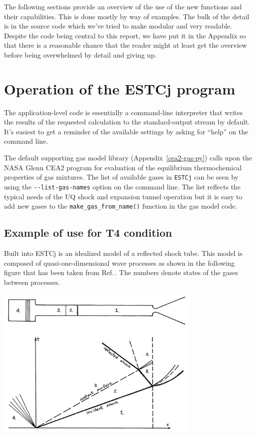 \documentclass[landscape,12pt,a4paper]{article}
\begin{document}
\medskip
The following sections provide an overview of the use of the new functions and their capabilities.
This is done mostly by way of examples.
The bulk of the detail is in the source code which we've tried to make modular and very readable.
Despite the code being central to this report, we have put it in the Appendix so that there is
a reasonable chance that the reader might at least get the overview 
before being overwhelmed by detail and giving up.

\newpage
\section{Operation of the ESTCj program}
%
The application-level code is essentially a command-line interpreter
that writes the results of the requested calculation to the standard-output stream
by default.
It's easiest to get a reminder of the available settings by asking for ``help''
on the command line.



The default supporting gas model library (Appendix~\ref{cea2-gas-py}) calls upon the NASA Glenn CEA2 program 
for evaluation of the equilibrium thermochemical properties of gas mixtures.
The list of available gases in \verb!ESTCj! can be seen by using the \verb!--list-gas-names! option 
on the command line.
The list reflects the typical needs of the UQ shock and expansion tunnel operation but 
it is easy to add new gases to the \verb!make_gas_from_name()! function in the gas model code.

\bigskip
\subsection{Example of use for T4 condition}
%
Built into ESTCj is an idealized model of a reflected shock tube.
This model is composed of quasi-one-dimensional wave processes 
as shown in the following figure that has been taken from Ref.\,\cite{krek_jacobs_93}.
The numbers denote states of the gases between processes.

\begin{center}
\includegraphics[width=10cm]{../figs/shock-tube-process-fig-from-stn-report.png}
\end{center}
\end{document}
